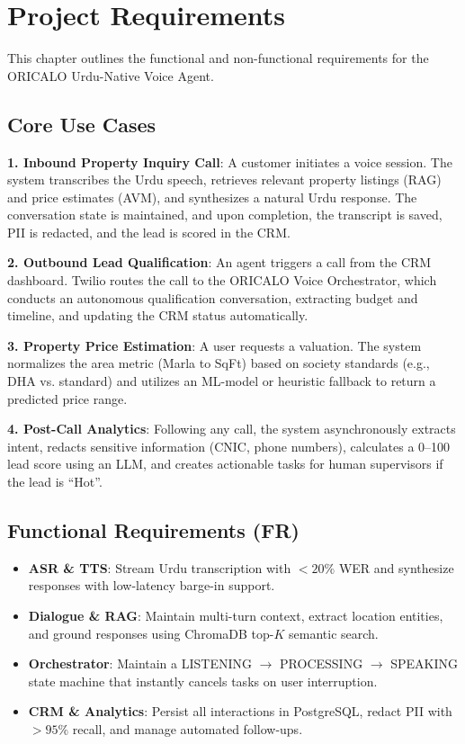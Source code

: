 \chapter{Project Requirements}
\label{ch:requirements}

This chapter outlines the functional and non-functional requirements for the ORICALO Urdu-Native Voice Agent.

\section{Core Use Cases}

\textbf{1. Inbound Property Inquiry Call}: A customer initiates a voice session. The system transcribes the Urdu speech, retrieves relevant property listings (RAG) and price estimates (AVM), and synthesizes a natural Urdu response. The conversation state is maintained, and upon completion, the transcript is saved, PII is redacted, and the lead is scored in the CRM.

\textbf{2. Outbound Lead Qualification}: An agent triggers a call from the CRM dashboard. Twilio routes the call to the ORICALO Voice Orchestrator, which conducts an autonomous qualification conversation, extracting budget and timeline, and updating the CRM status automatically.

\textbf{3. Property Price Estimation}: A user requests a valuation. The system normalizes the area metric (Marla to SqFt) based on society standards (e.g., DHA vs. standard) and utilizes an ML-model or heuristic fallback to return a predicted price range.

\textbf{4. Post-Call Analytics}: Following any call, the system asynchronously extracts intent, redacts sensitive information (CNIC, phone numbers), calculates a 0--100 lead score using an LLM, and creates actionable tasks for human supervisors if the lead is ``Hot''.

\section{Functional Requirements (FR)}

\begin{itemize}
    \item \textbf{ASR \& TTS}: Stream Urdu transcription with $<20\%$ WER and synthesize responses with low-latency barge-in support.
    \item \textbf{Dialogue \& RAG}: Maintain multi-turn context, extract location entities, and ground responses using ChromaDB top-$K$ semantic search.
    \item \textbf{Orchestrator}: Maintain a LISTENING $\rightarrow$ PROCESSING $\rightarrow$ SPEAKING state machine that instantly cancels tasks on user interruption.
    \item \textbf{CRM \& Analytics}: Persist all interactions in PostgreSQL, redact PII with $>95\%$ recall, and manage automated follow-ups.
\end{itemize}

